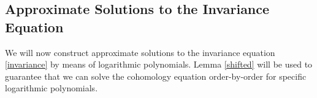 \documentclass{amsart}
\theoremstyle{plain}
\newtheorem{lemma}[theorem]{Lemma}
\theoremstyle{definition}
\begin{document}






\subsection{Approximate Solutions to the Invariance Equation}\label{approx_solutions}


We will now construct approximate solutions to the invariance equation \eqref{invariance} by means of logarithmic polynomials. Lemma \ref{shifted} will be used to guarantee that we can solve the cohomology equation order-by-order for specific logarithmic polynomials.
\end{document}
